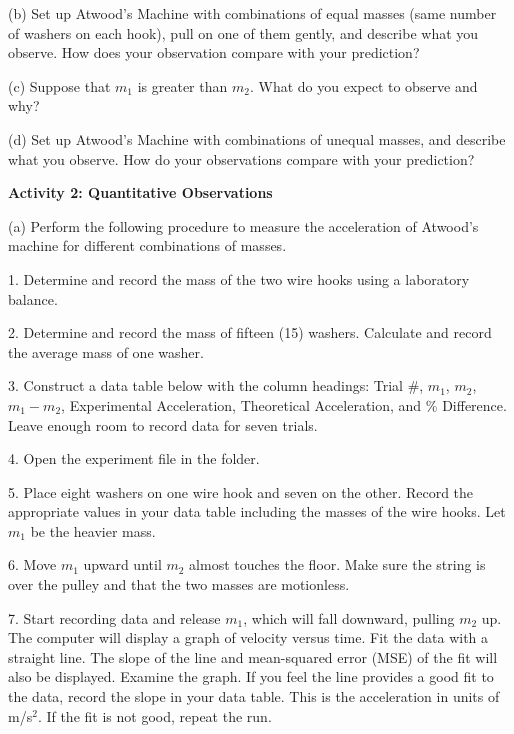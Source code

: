 (b) Set up Atwood's Machine with combinations of equal masses (same number of
washers on each hook), pull on one of them gently, and describe what you observe.
How does your observation compare with your prediction?
\vspace{20mm}

(c) Suppose that \( m_{1} \) is greater than \( m_{2} \). What do you expect
to observe and why?
\vspace{20mm}

\pagebreak[2] 
(d) Set up Atwood's Machine with combinations of unequal masses, and describe
what you observe. How do your observations compare with your prediction?
\vspace{20mm}

\textbf{Activity 2: Quantitative Observations }

(a) Perform the following procedure to measure the acceleration of Atwood's
machine for different combinations of masses. 

1. Determine and record the mass of the two wire hooks using a laboratory balance.
\vspace{10mm}

2. Determine and record the mass of fifteen (15) washers. Calculate and record
the average mass of one washer.
\vspace{10mm}

3. Construct a data table below with the column headings: Trial \#, \( m_{1} \),
\( m_{2} \), \( m_{1}  - m_{2} \), Experimental Acceleration, Theoretical
Acceleration, and \% Difference. Leave enough room to record data for seven
trials.
\vspace{50mm}

4. Open the experiment file  in the  \filename{\coursefolder} folder.

5. Place eight washers on one wire hook and seven on the other. Record the appropriate
values in your data table including the masses of the wire hooks. Let \( m_{1} \)
be the heavier mass. 

6. Move \( m_{1} \) upward until \( m_{2} \) almost touches the floor. Make
sure the string is over the pulley and that the two masses are motionless. 

7. Start recording data and release \( m_{1} \), which will fall downward,
pulling \( m_{2} \) up. The computer will display a graph of velocity versus
time. Fit the data with a straight line. The slope of the line and mean-squared
error (MSE) of the fit will also be displayed. Examine the graph. If you feel
the line provides a good fit to the data, record the slope in your data table.
This is the acceleration in units of m/s\( ^{2} \). If the fit is not good,
repeat the run. 

